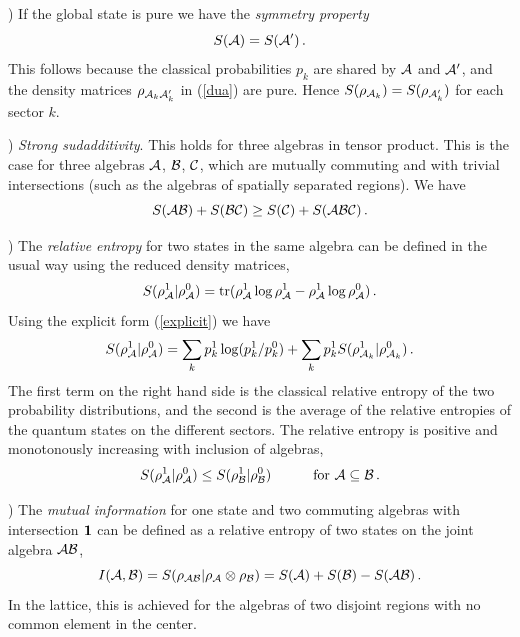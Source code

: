 \documentclass[12pt,a4paper]{article}
\begin{document}
) If the global state is pure we have the {\sl symmetry property} 
\begin{equation}
S({\cal A})=S({\cal A}^\prime)\,.
\end{equation}
 This follows because the 
classical probabilities $p_k$ are shared by ${\cal A}$ and ${\cal A}^\prime$, and the density matrices $\rho_{{\cal A}_k{\cal A}_k^\prime}$ 
in (\ref{dua}) are pure. Hence $S(\rho_{{\cal A}_k})=S(\rho_{{\cal A}_k^\prime})$ for each sector $k$. 

\bigskip

) {\sl Strong sudadditivity}. This holds for three algebras in tensor product. This is the case for three 
algebras ${\cal A}$, ${\cal B}$, ${\cal C}$, which are mutually commuting and with trivial intersections (such as the algebras of spatially separated regions). We have 
\begin{equation}
S({\cal A}{\cal B})+S({\cal B}{\cal C})\ge S({\cal C})+ S({\cal A}{\cal B}{\cal C})\,.
\end{equation} 

\bigskip 

) The {\sl relative entropy} for two states in the same algebra can be defined in the usual way using the reduced density matrices, 
\begin{equation}
S(\rho^1_{\cal A}|\rho^0_{\cal A})=\textrm{tr} (\rho^1_{\cal A} \log \rho^1_{\cal A}- \rho^1_{\cal A} \log \rho^0_{\cal A})\,.\label{rela}
\end{equation}
Using the explicit form (\ref{explicit}) we have 
 \begin{equation}
S(\rho^1_{\cal A}|\rho^0_{\cal A})=\sum_k p_k^1 \log(p_k^1/p_k^0)+\sum_k p_k^1 S(\rho^1_{{\cal A}_k}|\rho^0_{{\cal A}_k})\,.\label{rerelala}
\end{equation}
The first term on the right hand side is the classical relative entropy of the two probability distributions, and the second is the average of the 
relative entropies of the quantum states on the different sectors.  The relative entropy is positive and monotonously increasing with inclusion of algebras,
\begin{equation}
S(\rho^1_{\cal A}|\rho^0_{\cal A})\le S(\rho^1_{\cal B}|\rho^0_{\cal B})\,\hspace{1cm} \textrm{for } {\cal A}\subseteq {\cal B}\,. 
\end{equation}

\bigskip

) The {\sl mutual information} for one state and two commuting algebras with intersection ${\bf 1}$ can be defined as a relative 
entropy of two states on the joint algebra ${\cal A}{\cal B}$, 
\begin{equation}
I({\cal A},{\cal B})=S(\rho_{{\cal A} {\cal B}}| \rho_{\cal A}\otimes \rho_{{\cal B}} )=S({\cal A})+S({\cal B})-S({\cal A} {\cal B})\,. \label{mutu}
\end{equation}
In the lattice, this is achieved for the algebras of two disjoint regions with no common element in the center. 
\end{document}
